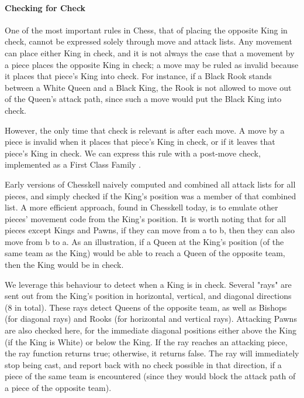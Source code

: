 \paragraph{Checking for Check} \label{checksection}

One of the most important rules in Chess, that of placing the opposite King in check, cannot be expressed solely through move and attack lists. Any movement can place either King in check, and it is not always the case that a movement by a piece places the opposite King in check; a move may be ruled as invalid because it places that piece's King into check. For instance, if a Black Rook stands between a White Queen and a Black King, the Rook is not allowed to move out of the Queen's attack path, since such a move would put the Black King into check.

However, the only time that check is relevant is after each move. A move by a piece is invalid when it places that piece's King in check, or if it leaves that piece's King in check. We can express this rule with a post-move check, implemented as a First Class Family .

Early versions of Chesskell naively computed and combined all attack lists for all pieces, and simply checked if the King's position was a member of that combined list. A more efficient approach, found in Chesskell today, is to emulate other pieces' movement code from the King's position. It is worth noting that for all pieces except Kings and Pawns, if they can move from a to b, then they can also move from b to a. As an illustration, if a Queen at the King's position (of the same team as the King) would be able to reach a Queen of the opposite team, then the King would be in check.

We leverage this behaviour to detect when a King is in check. Several "rays" are sent out from the King's position in horizontal, vertical, and diagonal directions (8 in total). These rays detect Queens of the opposite team, as well as Bishops (for diagonal rays) and Rooks (for horizontal and vertical rays). Attacking Pawns are also checked here, for the immediate diagonal positions either above the King (if the King is White) or below the King. If the ray reaches an attacking piece, the ray function returns true; otherwise, it returns false. The ray will immediately stop being cast, and report back with no check possible in that direction, if a piece of the same team is encountered (since they would block the attack path of a piece of the opposite team).

